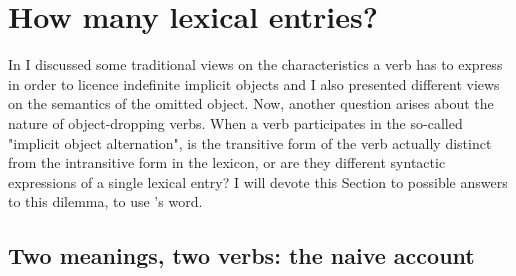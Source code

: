 \section{How many lexical entries?} 

In  I discussed some traditional views on the characteristics a verb has to express in order to licence indefinite implicit objects and I also presented different views on the semantics of the omitted object. Now, another question arises about the nature of object-dropping verbs. When a verb participates in the so-called "implicit object alternation", is the transitive form of the verb actually distinct from the intransitive form in the lexicon, or are they different syntactic expressions of a single lexical entry? I will devote this Section to possible answers to this dilemma, to use \textcite{Gillon2012}'s word.


\subsection{Two meanings, two verbs: the naive account} 

